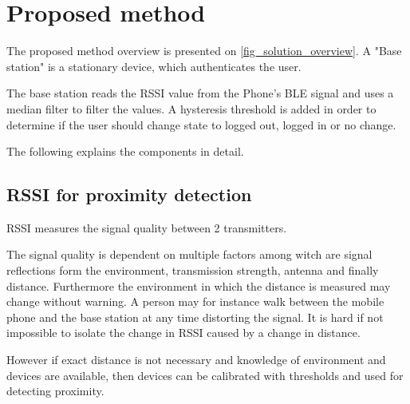\chapter{Proposed method}


The proposed method overview is presented on \cref{fig_solution_overview}. A "Base station" is a stationary device, which authenticates the user.

The base station reads the RSSI value from the Phone's BLE signal and uses a median filter to filter the values. A hysteresis threshold is added in order to determine if the user should change state to logged out, logged in or no change.

The following explains the components in detail.

\section{RSSI for proximity detection}

RSSI measures the signal quality between 2 transmitters.

The signal quality is dependent on multiple factors among witch are signal reflections form the environment, transmission strength, antenna and finally distance\cite{ref:rssidistance}.
Furthermore the environment in which the distance is measured may change without warning.
A person may for instance walk between the mobile phone and the base station at any time distorting the signal.
It is hard if not impossible to isolate the change in RSSI caused by a change in distance\cite{ref:bandara}.

However if exact distance is not necessary and knowledge of environment and devices are available, then devices can be calibrated with thresholds and used for detecting proximity.



